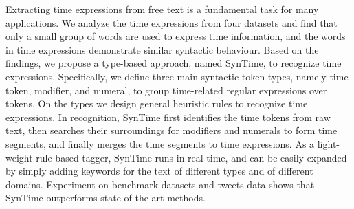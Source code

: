 Extracting time expressions from free text is a fundamental task for many applications. We analyze the time expressions from four datasets and find that only a small group of words are used to express time information, and the words in time expressions demonstrate similar syntactic behaviour. Based on the findings, we propose a type-based approach, named SynTime, to recognize time expressions. Specifically, we define three main syntactic token types, namely time token, modifier, and numeral, to group time-related regular expressions over tokens. On the types we design general heuristic rules to recognize time expressions. In recognition, SynTime first identifies the time tokens from raw text, then searches their surroundings for modifiers and numerals to form time segments, and finally merges the time segments to time expressions. As a light-weight rule-based tagger, SynTime runs in real time, and can be easily expanded by simply adding keywords for the text of different types and of different domains. Experiment on benchmark datasets and tweets data shows that SynTime outperforms state-of-the-art methods.
